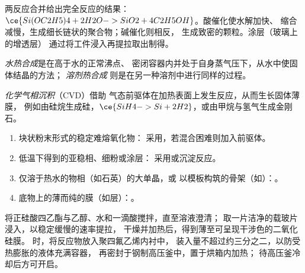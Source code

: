 两反应合并给出完全反应的结果：
$\ce{Si(OC2H5)4 + 2H2O -> SiO2 + 4C2H5OH}$。酸催化使水解加快、
缩合减慢，生成细长链状的聚合物；碱催化则相反，
生成致密的颗粒。涂层（玻璃上的增透层）
通过将工件浸入再提拉取出制得。

\begin{definition}[水热合成]\label{def:b3:inorganic-materials:hydrothermal}
\emph{水热合成}是在高于水的正常沸点、
密闭容器内并处于自身蒸气压下，从水中使固体结晶的方法；
\emph{溶剂热合成}
则是在另一种溶剂中进行同样的过程。
\end{definition}

\begin{definition}[化学气相沉积]\label{def:b3:inorganic-materials:cvd}
\emph{化学气相沉积}（CVD）借助
气态前驱体在加热表面上发生反应，从而生长固体薄膜，
例如由硅烷生成硅，$\ce{SiH4 -> Si + 2H2}$，或由甲烷与氢气生成金刚石。
\end{definition}

\begin{method}[选择合成路线]\label{met:b3:inorganic-materials:route}
\begin{enumerate}
  \item 块状粉末形式的稳定难熔氧化物：
        采用，若混合困难则加入前驱体。
  \item 低温下得到的亚稳相、细粉或涂层：
        采用或沉淀反应。
  \item 仅溶于热水的物相（如石英）的大单晶，或
        以模板构筑的骨架（如）：。
  \item 底物上的薄而纯的膜（如层）：。
\end{enumerate}
\end{method}

\begin{inthelab}[溶胶–凝胶涂层与高压釜]
将正硅酸四乙酯与乙醇、水和一滴酸搅拌，直至溶液澄清；
取一片洁净的载玻片浸入，以稳定缓慢的速率提拉，
干燥并加热后，得到薄至可呈现干涉色的二氧化硅膜。
时，将反应物放入聚四氟乙烯内衬中，
装入量不超过约三分之二，以防受热膨胀的液体充满容器，
再密封于钢制高压釜中，置于烘箱内加热；
待高压釜冷却后方可开启。
\end{inthelab}

